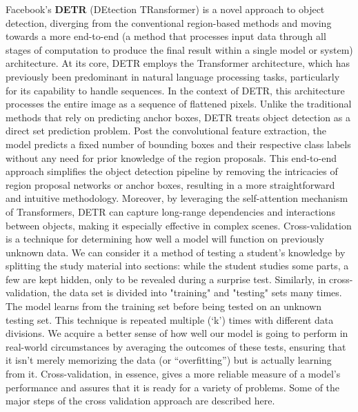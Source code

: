 
Facebook's \textbf{DETR} (DEtection TRansformer) \cite{carion2020end} is a novel approach to object detection, diverging from the conventional region-based methods and moving towards a more end-to-end (a method that processes input data through all stages of computation to produce the final result within a single model or system) architecture. At its core, DETR employs the Transformer architecture\cite{vaswani2017attention}, which has previously been predominant in natural language processing tasks, particularly for its capability to handle sequences. In the context of DETR, this architecture processes the entire image as a sequence of flattened pixels. Unlike the traditional methods that rely on predicting anchor boxes, DETR treats object detection as a direct set prediction problem. Post the convolutional feature extraction, the model predicts a fixed number of bounding boxes and their respective class labels without any need for prior knowledge of the region proposals. This end-to-end approach simplifies the object detection pipeline by removing the intricacies of region proposal networks or anchor boxes, resulting in a more straightforward and intuitive methodology. Moreover, by leveraging the self-attention mechanism of Transformers, DETR can capture long-range dependencies and interactions between objects, making it especially effective in complex scenes.
Cross-validation is a technique for determining how well a model will function on previously unknown data. We can consider it a method of testing a student's knowledge by splitting the study material into sections: while the student studies some parts, a few are kept hidden, only to be revealed during a surprise test. Similarly, in cross-validation, the data set is divided into "training" and "testing" sets many times. The model learns from the training set before being tested on an unknown testing set. This technique is repeated multiple (`k') times with different data divisions. We acquire a better sense of how well our model is going to perform in real-world circumstances by averaging the outcomes of these tests, ensuring that it isn't merely memorizing the data (or ``overfitting'') but is actually learning from it. Cross-validation, in essence, gives a more reliable measure of a model's performance and assures that it is ready for a variety of problems. Some of the major steps of the cross validation approach are described here.

